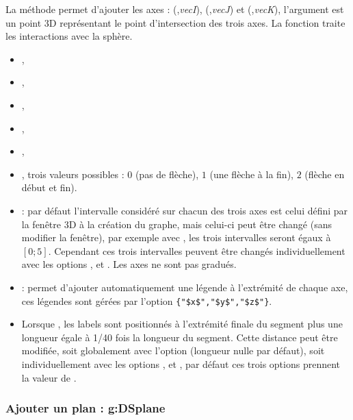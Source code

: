 La méthode  permet d'ajouter les axes : (,\emph{vecI}), (,\emph{vecJ}) et (,\emph{vecK}), l'argument  est un point 3D représentant le point d'intersection des trois axes.  La fonction traite les interactions avec la sphère. \writeoptions
    \begin{itemize}
        \item {}, 
        \item {},
        \item {},
        \item {},
        \item {},
        \item {}, trois valeurs possibles : $0$ (pas de flèche), $1$ (une flèche à la fin), $2$ (flèche en début et fin).
        \item {} : par défaut l'intervalle considéré sur chacun des trois axes est celui défini par la fenêtre 3D à la création du graphe, mais celui-ci peut être changé (sans modifier la fenêtre), par exemple avec , les trois intervalles seront égaux à $[0;5]$.
        Cependant ces trois intervalles peuvent être changés individuellement avec les options ,  et . Les axes ne sont pas gradués.
        \item {} :  permet d'ajouter automatiquement une légende à l'extrémité de chaque axe, ces légendes sont gérées par l'option \verb|{"$x$","$y$","$z$"}|.
        \item Lorsque , les labels sont positionnés à l'extrémité finale du segment plus une longueur égale à 1/40 fois la longueur du segment. Cette distance peut être modifiée, soit globalement avec l'option  (longueur nulle par défaut), soit individuellement avec les options ,  et , par défaut ces trois options prennent la valeur de .
    \end{itemize} 

\subsubsection{Ajouter un plan : g:DSplane}

